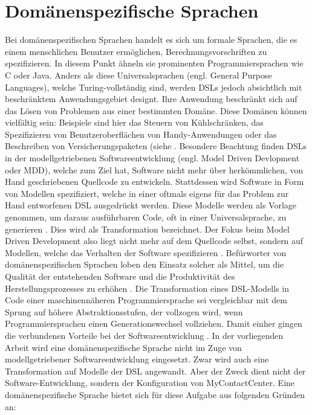 \section{Domänenspezifische Sprachen}
Bei domänenspezifischen Sprachen handelt es sich um formale Sprachen, die es einem menschlichen Benutzer ermöglichen, Berechnungsvorschriften zu spezifizieren. In diesem Punkt ähneln sie prominenten Programmiersprachen wie C oder Java. Anders als diese Universalsprachen (engl. General Purpose Languages), welche Turing-vollständig sind, werden DSLs jedoch absichtlich mit beschränktem Anwendungsgebiet designt. Ihre Anwendung beschränkt sich auf das Lösen von Problemen aus einer bestimmten Domäne. Diese Domänen können vielfältig sein: Beispiele sind hier das Steuern von Kühlschränken, das Spezifizieren von Benutzeroberflächen von Handy-Anwendungen oder das Beschreiben von Versicherungspaketen (siehe \cite[S. 93ff.]{Kelly:08}. Besondere Beachtung finden DSLs in der modellgetriebenen Softwareentwicklung (engl. Model Driven Devlopment oder MDD), welche zum Ziel hat, Software nicht mehr über herkömmlichen, von Hand geschriebenen Quellcode zu entwickeln. Stattdessen wird Software in Form von Modellen spezifiziert, welche in einer oftmals eigens für das Problem zur Hand entworfenen DSL ausgedrückt werden. Diese Modelle werden als Vorlage genommen, um daraus ausführbaren Code, oft in einer  Universalsprache, zu generieren \cite[S. 29]{Voelter:13}. Dies wird als Transformation bezeichnet. Der Fokus beim Model Driven Development also liegt nicht mehr auf dem Quellcode selbst, sondern auf Modellen, welche das Verhalten der Software spezifizieren \cite[S. 3]{Kleppe:09}. Befürworter von domänenspezifischen Sprachen loben den Einsatz solcher als Mittel, um die Qualität der entstehenden Software und die Produktivität des Herstellungsprozesses zu erhöhen \cite[S. 33f]{Fowler:11}. Die Transformation eines DSL-Modells in Code einer maschinennäheren Programmiersprache sei vergleichbar mit dem Sprung auf höhere Abstraktionsstufen, der vollzogen wird, wenn Programmiersprachen einen Generationswechsel vollziehen. Damit einher gingen die verbundenen Vorteile bei der Softwareentwicklung \cite[S. 15ff]{Kelly:08}.
\newline
In der vorliegenden Arbeit wird eine domänenspezifische Sprache nicht im Zuge von modellgetriebener Softwareentwicklung eingesetzt. Zwar wird auch eine Transformation auf Modelle der DSL angewandt. Aber der Zweck dient nicht der Software-Entwicklung, sondern der Konfiguration von MyContactCenter. Eine domänenspezifische Sprache bietet sich für diese Aufgabe aus folgenden Gründen an: 
